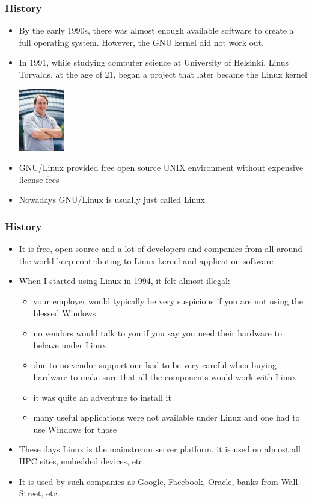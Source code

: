 \documentclass{beamer}
\begin{document}
\begin{frame}[fragile]
  \frametitle{History}
  \begin{itemize}
  \item By the early 1990s, there was almost enough available software to create a full operating system. However, the GNU kernel did not work out.
  \item In 1991, while studying computer science at University of Helsinki, Linus Torvalds, at the age of 21, began a project that later became the Linux kernel
\begin{center}
\includegraphics[width=2cm]{graphs/Linus_Torvalds.jpeg}
\end{center}
  \item GNU/Linux provided free open source UNIX environment without expensive license fees
  \item Nowadays GNU/Linux is usually just called Linux
  \end{itemize}
\end{frame}


\begin{frame}[fragile]
  \frametitle{History}
  \begin{itemize}
  \item It is free, open source and a lot of developers and companies from all around the world keep contributing to Linux kernel and application software
  \item When I started using Linux in 1994, it felt almost illegal: 
    \begin{itemize}
    \item your employer would typically be very suspicious if you are not using the blessed Windows 
    \item no vendors would talk to you if you say you need their hardware to behave under Linux
    \item due to no vendor support one had to be very careful when buying hardware to make sure that all the components would work with Linux 
    \item it was quite an adventure to install it
    \item many useful applications were not available under Linux and one had to use Windows for those
    \end{itemize}
  \item These days Linux is the mainstream server platform, it is used on almost all HPC sites, embedded devices, etc.
  \item It is used by such companies as Google, Facebook, Oracle, banks from Wall Street, etc.
  \end{itemize}
\end{frame}
\end{document}
